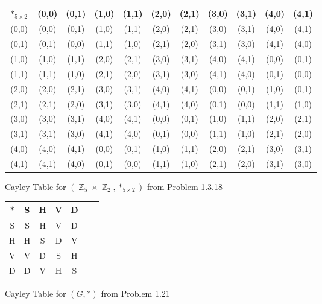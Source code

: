 \documentclass{amsbook}
\DeclareMathOperator{\Z}{\mathbb{Z}}
\begin{document}
		\begin{figure}[h]
			\begin{tabular}{c|cccccccccc}
				$*_{5 \times 2}$ & (0,0) & (0,1) & (1,0) &(1,1) & (2,0) & (2,1) & (3,0) & (3,1) & (4,0) & (4,1) \\
				\hline
				(0,0) & \color{red}(0,0)\color{black} & (0,1) & (1,0) & (1,1) & (2,0) & (2,1) & (3,0) & (3,1) & (4,0) & (4,1) \\
				(0,1) & (0,1) & \color{red}(0,0)\color{black} & (1,1) & (1,0) & (2,1) & (2,0) & (3,1) & (3,0) & (4,1) & (4,0) \\
				(1,0) & (1,0) & (1,1) & (2,0) & (2,1) & (3,0) & (3,1) & (4,0) & (4,1) & \color{red}(0,0)\color{black} & (0,1) \\
				(1,1) & (1,1) & (1,0) & (2,1) & (2,0) & (3,1) & (3,0) & (4,1) & (4,0) & (0,1) & \color{red}(0,0)\color{black} \\
				(2,0) & (2,0) & (2,1) & (3,0) & (3,1) & (4,0) & (4,1) & \color{red}(0,0)\color{black} & (0,1) & (1,0) & (0,1) \\
				(2,1) & (2,1) & (2,0) & (3,1) & (3,0) & (4,1) & (4,0) & (0,1) & \color{red}(0,0)\color{black} & (1,1) & (1,0) \\
				(3,0) & (3,0) & (3,1) & (4,0) & (4,1) & \color{red}(0,0)\color{black} & (0,1) & (1,0) & (1,1) & (2,0) & (2,1) \\
				(3,1) & (3,1) & (3,0) & (4,1) & (4,0) & (0,1) & \color{red}(0,0)\color{black} & (1,1) & (1,0) & (2,1) & (2,0) \\
				(4,0) & (4,0) & (4,1) & \color{red}(0,0)\color{black} & (0,1) & (1,0) & (1,1) & (2,0) & (2,1) & (3,0) & (3,1) \\
				(4,1) & (4,1) & (4,0) & (0,1) & \color{red}(0,0)\color{black} & (1,1) & (1,0) & (2,1) & (2,0) & (3,1) & (3,0)  
			\end{tabular}
			\caption{Cayley Table for $(\Z_{5} \times \Z_{2}, *_{5 \times 2})$ from Problem 1.3.18}
			\label{118CT}
		\end{figure}

		\begin{figure}[h]
			\begin{tabular}{c|cccccc}
				$*$ & S & H & V & D  \\
				\hline
				S & \color{red}S\color{black} & H & V & D \\
				H & H & \color{red}S\color{black} & D & V \\
				V & V & D & \color{red}S\color{black} & H \\
				D & D & V & H & \color{red}S\color{black} \\
			\end{tabular}
			\caption{Cayley Table for $(G, *)$ from Problem 1.21}
			\label{121CT}
		\end{figure}
\end{document}

